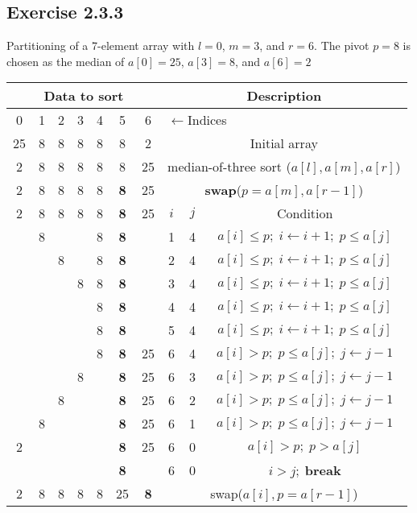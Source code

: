 \documentclass{article}
\begin{document}
\subsection*{Exercise 2.3.3}

Partitioning of a 7-element array with \(l=0\), \(m=3\), and \(r=6\). The pivot \(p=8\) is chosen as the median of \(a[0]=25\), \(a[3]=8\), and \(a[6]=2\)

\begin{tabular}{|c|c|c|c|c|c|c|c|c|c|}
\hline
\multicolumn{7}{|c|}{\textbf{Data to sort}}& \multicolumn{3}{|c|}{\textbf{Description}}\\
\hline
0& 1& 2& 3& 4& 5& 6& \multicolumn{3}{|l|}{ \(\leftarrow\)Indices} \\
\hline
25& 8& 8& 8& 8& 8& 2& \multicolumn{3}{|c|}{Initial array} \\
\hline
2& 8& 8& 8& 8& 8& 25& \multicolumn{3}{|c|}{median-of-three sort (\( a[l],a[m],a[r] \))} \\
\hline
2& 8& 8& 8& 8& \textbf{8} & 25& \multicolumn{3}{|c|}{ \textbf{swap}(\( p=a[m],a[r-1] \))} \\
\hline
2& 8& 8& 8& 8& \textbf{8} & 25& \(i\)& \(j\)& Condition \\
\hline
& 8& & & 8& \textbf{8}& & 1& 4& \(a[i] \leq p;\; i \leftarrow i+1;\; p \leq a[j]\) \\
\hline
& & 8& & 8& \textbf{8}& & 2& 4& \(a[i] \leq p;\; i \leftarrow i+1;\; p \leq a[j]\) \\
\hline
& & & 8& 8& \textbf{8}& & 3& 4& \(a[i] \leq p;\; i \leftarrow i+1;\; p \leq a[j]\) \\
\hline
& & & & 8& \textbf{8}& & 4& 4& \(a[i] \leq p;\; i \leftarrow i+1;\; p \leq a[j]\) \\
\hline
& & & & 8& \textbf{8}& & 5& 4& \(a[i] \leq p;\; i \leftarrow i+1;\; p \leq a[j]\) \\
\hline
& & & & 8& \textbf{8}& 25& 6& 4& \(a[i] > p;\; p \leq a[j];\; j\leftarrow j-1\) \\
\hline
& & & 8& & \textbf{8}& 25& 6& 3& \(a[i] > p;\; p \leq a[j];\; j\leftarrow j-1\) \\
\hline
& & 8& & & \textbf{8}& 25& 6& 2& \(a[i] > p;\; p \leq a[j];\; j\leftarrow j-1\) \\
\hline
& 8& & & & \textbf{8}& 25& 6& 1& \(a[i] > p;\; p \leq a[j];\; j\leftarrow j-1\) \\
\hline
2& & & & & \textbf{8}& 25& 6& 0& \(a[i] > p;\; p > a[j]\) \\
\hline
& & & & & \textbf{8}& & 6& 0& \(i >j;\;\)\textbf{break} \\
\hline
2& 8& 8& 8& 8& 25& \textbf{8}& \multicolumn{3}{|c|}{swap(\(a[i],p=a[r-1]\))} \\
\hline
\end{tabular}
\end{document}
